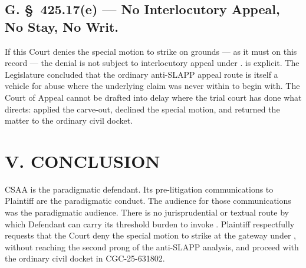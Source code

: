 \subsection*{G. \S~425.17(e) --- No Interlocutory Appeal, No Stay, No Writ.}

If this Court denies the special motion to strike on  grounds --- as it must on this record --- the denial is not subject to interlocutory appeal under .  is explicit. The Legislature concluded that the ordinary anti-SLAPP appeal route is itself a vehicle for abuse where the underlying claim was never within  to begin with. The Court of Appeal cannot be drafted into delay where the trial court has done what  directs: applied the carve-out, declined the special motion, and returned the matter to the ordinary civil docket.

\section*{V. CONCLUSION}

CSAA is the paradigmatic  defendant. Its pre-litigation communications to Plaintiff are the paradigmatic  conduct. The audience for those communications was the paradigmatic  audience. There is no jurisprudential or textual route by which Defendant can carry its threshold burden to invoke . Plaintiff respectfully requests that the Court deny the special motion to strike at the gateway under , without reaching the second prong of the anti-SLAPP analysis, and proceed with the ordinary civil docket in CGC-25-631802.



